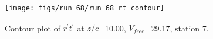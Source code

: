 \begin{figure}[H]
\centering
\texttt{[image: figs/run\_68/run\_68\_rt\_contour]}
\caption{Contour plot of $\overline{r^\prime t^\prime}$ at $z/c$=10.00, $V_{free}$=29.17, station 7.}
\label{fig:run_68_rt_contour}
\end{figure}


